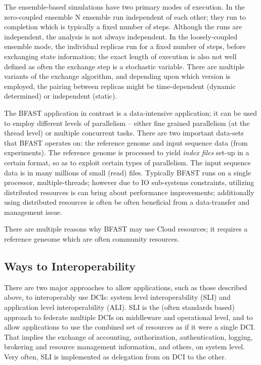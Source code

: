 \documentclass[10pt,conference,final,letterpaper,twoside,twocolumn,]{IEEEtran}
\begin{document}
 The ensemble-based simulations have two primary modes of execution.
 In the zero-coupled ensemble N ensemble run independent of each
 other; they run to completion which is typically a fixed number of
 steps. Although the runs are independent, the analysis is not always
 independent. In the loosely-coupled ensemble mode, the individual
 replicas run for a fixed number of steps, before exchanging state
 information; the exact length of execution is also not well defined
 as often the exchange step is a stochastic variable.  There are
 multiple variants of the exchange algorithm, and depending upon which
 version is employed, the pairing between replicas might be
 time-dependent (dynamic determined) or independent (static).

 The BFAST application in contrast is a data-intensive application; it
 can be used to employ different levels of parallelism -- either fine
 grained parallelism (at the thread level) or multiple concurrent
 tasks.  There are two important data-sets that BFAST operates on: the
 reference genome and input sequence data (from experiments). The
 reference genome is processed to yield {\it index files} set-up in a
 certain format, so as to exploit certain types of parallelism. The
 input sequence data is in many millions of small (read) files.
 Typically BFAST runs on a single processor, multiple-threads; however
 due to IO sub-systems constraints, utilizing distributed resources is
 can bring about performance improvements; additionally using
 distributed resources is often be often beneficial from a
 data-transfer and management issue.

 There are multiple reasons why BFAST may use Cloud resources; it
 requires a reference geneome which are often community resources.
 

 \subsection*{Ways to Interoperability}
 
 There are two major approaches to allow applications, such as those
 described above, to interoperably use DCIs: system level
 interoperability (SLI) and application level interoperability (ALI).
 SLI is the (often standards based) approach to federate multiple DCIs
 on middleware and operational level, and to allow applications to use
 the combined set of resources as if it were a single DCI.  That
 implies the exchange of accounting, authorization, authentication,
 logging, brokering and resource management information, and others,
 on system level.  Very often, SLI is implemented as delegation from
 on DCI to the other.
\end{document}
